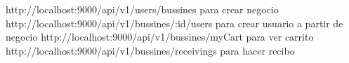 http://localhost:9000/api/v1/users/bussines para crear negocio
http://localhost:9000/api/v1/bussines/:id/users para crear usuario a partir de negocio
http://localhost:9000/api/v1/bussines/myCart para ver carrito
http://localhost:9000/api/v1/bussines/receivings para hacer recibo
